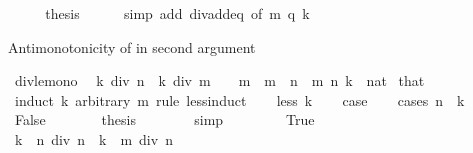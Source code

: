 \begin{isabellebody}
\ \ \isamarkupfalse%
\ \isamarkupfalse%
\ {\isacharquery}{\kern0pt}thesis\isanewline
\ \ \ \ \isamarkupfalse%
\ {\isacharparenleft}{\kern0pt}simp\ add{\isacharcolon}{\kern0pt}\ div{\isacharunderscore}{\kern0pt}add{}{\isacharunderscore}{\kern0pt}eq\ {\isacharbrackleft}{\kern0pt}of\ m\ q\ k{\isacharbrackright}{\kern0pt}{\isacharparenright}{\kern0pt}\isanewline
{}\isamarkupfalse%
%
\endisatagproof
{\isafoldproof}%
%
\isadelimproof
%
\endisadelimproof
%
\begin{isamarkuptext}%
Antimonotonicity of  in second argument%
\end{isamarkuptext}\isamarkuptrue%
\isamarkupfalse%
\ div{\isacharunderscore}{\kern0pt}le{\isacharunderscore}{\kern0pt}mono{}{\isacharcolon}{\kern0pt}\isanewline
\ \ {\isachardoublequoteopen}k\ div\ n\ {\isasymle}\ k\ div\ m{\isachardoublequoteclose}\ \ {\isachardoublequoteopen}{}\ {\isacharless}{\kern0pt}\ m{\isachardoublequoteclose}\ \ {\isachardoublequoteopen}m\ {\isasymle}\ n{\isachardoublequoteclose}\ \ m\ n\ k\ {\isacharcolon}{\kern0pt}{\isacharcolon}{\kern0pt}\ nat\isanewline
%
\isadelimproof
%
\endisadelimproof
%
\isatagproof
{}\isamarkupfalse%
\ that\ \isamarkupfalse%
\ {\isacharparenleft}{\kern0pt}induct\ k\ arbitrary{\isacharcolon}{\kern0pt}\ m\ rule{\isacharcolon}{\kern0pt}\ less{\isacharunderscore}{\kern0pt}induct{\isacharparenright}{\kern0pt}\isanewline
\ \ \isamarkupfalse%
\ {\isacharparenleft}{\kern0pt}less\ k{\isacharparenright}{\kern0pt}\isanewline
\ \ \isamarkupfalse%
\ {\isacharquery}{\kern0pt}case\isanewline
\ \ \isamarkupfalse%
\ {\isacharparenleft}{\kern0pt}cases\ {\isachardoublequoteopen}n\ {\isasymle}\ k{\isachardoublequoteclose}{\isacharparenright}{\kern0pt}\isanewline
\ \ \ \ \isamarkupfalse%
\ False\isanewline
\ \ \ \ \isamarkupfalse%
\ \isamarkupfalse%
\ {\isacharquery}{\kern0pt}thesis\isanewline
\ \ \ \ \ \ \isamarkupfalse%
\ simp\isanewline
\ \ \isamarkupfalse%
\isanewline
\ \ \ \ \isamarkupfalse%
\ True\isanewline
\ \ \ \ \isamarkupfalse%
\ {\isachardoublequoteopen}{\isacharparenleft}{\kern0pt}k\ {\isacharminus}{\kern0pt}\ n{\isacharparenright}{\kern0pt}\ div\ n\ {\isasymle}\ {\isacharparenleft}{\kern0pt}k\ {\isacharminus}{\kern0pt}\ m{\isacharparenright}{\kern0pt}\ div\ n{\isachardoublequoteclose}\isanewline

\end{isabellebody}
